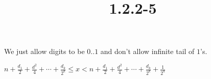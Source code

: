 \documentclass{article}
\title{1.2.2-5}
\begin{document}
\maketitle

We just allow digits to be $0..1$ and don't allow infinite tail of $1$'s.

$n + \frac{d_1}{2} + \frac{d^2}{4} + \cdots + \frac{d_k}{2^k} \leq x < n + \frac{d_1}{2} + \frac{d^2}{4} + \cdots + \frac{d_k}{2^k} + \frac{1}{2^k}$
\end{document}
